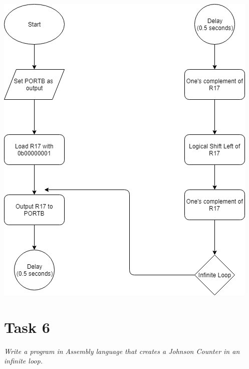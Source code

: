 \documentclass[a4paper,12pt]{article}
\begin{document}
\begin{center}
\includegraphics[scale=0.7]{img/Task5.png}
\end{center}
\newpage
\section{Task 6}
\textit{Write a program in Assembly language that creates a Johnson Counter in an infinite loop.}
\end{document}
